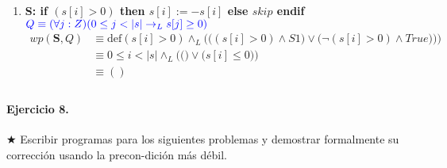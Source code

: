 \documentclass{article}
\begin{document}
\begin{enumerate}[label=\alph*)]
   	\item
   		\textbf{S: if $(s[i]>0)$ then $s[i]:= -s[i] $ else $skip$ endif}\\
   		\hspace*{24mm}$\color{blue}Q \equiv (\forall j :Z)(0 \leq j < |s| 
   			\rightarrow_L s[j] \geq 0)$\\
   		\begin{align*}
   			wp(\textbf{S},Q)&\equiv \textrm{def}(s[i]>0)\wedge_L 
   				\Bigg(\Big((s[i]>0)\wedge S1\Big) \vee\Big(\neg (s[i]>0)\wedge True)\Big)\Bigg)\\
   							&\equiv 0\leq i<|s|\wedge_L\Bigg(\Big(\Big) \vee \Big(s[i]\leq 0
   							\Big)\Bigg)\\
   							&\equiv () \\
   		\end{align*}	
\end{enumerate}
                                                          
\paragraph{Ejercicio 8.} $\bigstar$ Escribir programas para los siguientes problemas y demostrar 
formalmente su corrección usando la precon-dición más débil.
\end{document}
